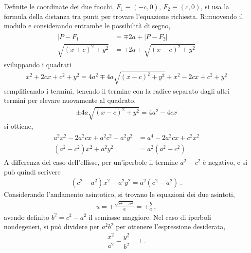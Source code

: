 \documentclass[letterpaper,10pt,english]{jupyterBook}
\begin{document}
\sphinxAtStartPar
Definite le coordinate dei due fuochi, \(F_1 \equiv (-c,0)\), \(F_2 \equiv (c,0)\), si usa la formula della distanza tra punti per trovare l’equazione richiesta. Rimuovendo il modulo e considerando entrambe le possibilità di segno,
\begin{equation*}
\begin{split}\begin{aligned}
  |P - F_1| & = \mp 2 a + |P - F_2| \\
  \sqrt{(x+c)^2 + y^2} & = \mp 2a + \sqrt{(x-c)^2 + y^2}  
\end{aligned}\end{split}
\end{equation*}
\sphinxAtStartPar
sviluppando i quadrati
\begin{equation*}
\begin{split}x^2 + 2 c x + c^2 + y^2 = 4 a^2 \mp 4a \sqrt{(x-c)^2 + y^2} + x^2 - 2 c x + c^2 + y^2\end{split}
\end{equation*}
\sphinxAtStartPar
semplificando i termini, tenendo il termine con la radice separato dagli altri termini per elevare nuovamente al quadrato,
\begin{equation*}
\begin{split}\pm 4a \sqrt{(x-c)^2 + y^2} = 4 a^2 - 4 c x\end{split}
\end{equation*}
\sphinxAtStartPar
si ottiene,
\begin{equation*}
\begin{split}\begin{aligned}
  a^2 x^2-2 a^2 c x + a^2 c^2 + a^2 y^2 & = a^4 - 2 a^2 c x + c^2 x^2 \\  
  (a^2 - c^2)x^2 + a^2 y^2 & = a^2 ( a^2 - c^2 )
\end{aligned}\end{split}
\end{equation*}
\sphinxAtStartPar
A differenza del caso dell’ellisse, per un’iperbole il termine \(a^2 - c^2\) è negativo, e si può quindi scrivere
\begin{equation*}
\begin{split}(c^2 - a^2) x^2 - a^2 y^2 = a^2 ( c^2 - a^2 ) \ .\end{split}
\end{equation*}
\sphinxAtStartPar
Considerando l’andamento asintotico, si trovano le equazioni dei due asintoti,
\begin{equation*}
\begin{split}u = \mp \frac{\sqrt{c^2-a^2}}{a} = \mp \frac{b}{a} \ ,\end{split}
\end{equation*}
\sphinxAtStartPar
avendo definito \(b^2 = c^2 - a^2\) il semiasse maggiore.
Nel caso di iperboli non\sphinxhyphen{}degeneri, si può dividere per \(a^2 b^2\) per ottenere l’espressione desiderata,
\begin{equation*}
\begin{split}\dfrac{x^2}{a^2} - \dfrac{y^2}{b^2} = 1 \ .\end{split}
\end{equation*}
\sphinxstepscope
\end{document}
